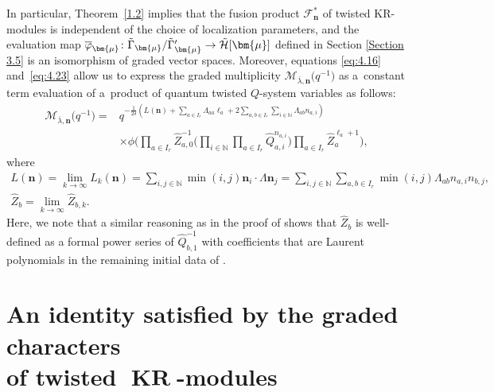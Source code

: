\documentclass[10pt,a4paper]{amsart}
\numberwithin{equation}{section}
\DeclareMathOperator{\KR}{KR}
\begin{document}
In particular, Theorem~\ref{1.2} implies that the fusion product $\mathcal{F}_{\mathbf{n}}^*$ of twisted KR-modules is independent of the choice of localization parameters, and the evaluation map $\smash{\overline{\varphi}_{ \bm{\mu}}\colon \tilde{\Gamma}_{\bm{ \mu}}/\tilde{\Gamma}_{\bm{\mu}}' }\to\tilde{\mathcal{H}}[\bm{\mu}]$ defined in Section \ref{Section 3.5} is an isomorphism of graded vector spaces. Moreover, equations \eqref{eq:4.16} and~\eqref{eq:4.23} allow us to express the graded multiplicity $\mathcal{M}_{\overline{\lambda},\mathbf{n}}\bigl(q^{-1}\bigr)$ as a~constant term evaluation of a~product of quantum twisted $Q$-system variables as follows:
\begin{align}
\mathcal{M}_{\overline{\lambda},\mathbf{n}}\bigl(q^{-1}\bigr)
={}&q^{-\frac{1}{2\delta}(L(\mathbf{n})+\sum_{a\in I_r}\Lambda_{aa}\ell_a+2\sum_{a,b\in I_r}\sum_{i\in\mathbb{N}}\Lambda_{ab}n_{a,i})}\nonumber\\
&\times\phi\biggl(\prod_{a\in I_r}\widehat{Z}_{a,0}^{-1}\biggl(\prod_{i\in\mathbb{N}}\prod_{a\in I_r}\widehat{Q}_{a,i} ^{n_{a,i}}\biggr)\prod_{a\in I_r}\widehat{Z}_a^{\ell_a+1}\biggr),\label{eq:4.29}
\end{align}
where
\begin{gather*}
L(\mathbf{n})
=\lim_{k\to\infty}L_k(\mathbf{n})
=\sum_{i,j\in\mathbb{N}}\min(i,j)\mathbf{n}_i\cdot\Lambda\mathbf{n}_j
=\sum_{i,j\in\mathbb{N}}\sum_{a,b\in I_r}\min(i,j)\Lambda_{ab} n_{a,i}n_{b,j},\\
\widehat{Z}_b
=\lim_{k\to\infty}\widehat{Z}_{b,k}.
\end{gather*}
Here, we note that a similar reasoning as in the proof of \cite[Theorem 5.17]{DFK14} shows that $\widehat{Z}_b$ is well-defined as a formal power series of $\widehat{Q}_{b,1}^{-1}$ with coefficients that are Laurent polynomials in the remaining initial data of .

\section[An identity satisfied by the graded characters of twisted KR-modules]{An identity satisfied by the graded characters\\ of twisted $\boldsymbol{ \KR}$-modules}\label{Section 5}
\end{document}
